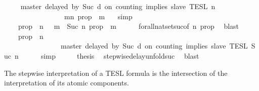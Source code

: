 \begin{isabellebody}
\ \ \isamarkupfalse%
\ {\isacartoucheopen}{\isasymlbrakk}\ master\ delayed\ by\ {\isacharparenleft}Suc\ d{\isacharparenright}\ on\ counting\ implies\ slave\ {\isasymrbrakk}\isactrlsub T\isactrlsub E\isactrlsub S\isactrlsub L\isactrlbsup {\isasymge}\ n\isactrlesup \ {\isacharequal}\isanewline
\ \ \ \ \ \ \ \ \ \ \ \ \ \ \ \ {\isacharbraceleft}{\isasymrho}{\isachardot}\ {\isasymforall}m{\isasymge}n{\isachardot}\ {\isacharquery}prop\ {\isasymrho}\ m{\isacharbraceright}\ {\isacartoucheclose}\ \isamarkupfalse%
\ simp\isanewline
\ \ \isamarkupfalse%
\ \isamarkupfalse%
\ {\isacartoucheopen}{\isachardot}{\isachardot}{\isachardot}\ {\isacharequal}\ {\isacharbraceleft}{\isasymrho}{\isachardot}\ {\isacharquery}prop\ {\isasymrho}\ n{\isacharbraceright}\ {\isasyminter}\ {\isacharbraceleft}{\isasymrho}{\isachardot}\ {\isasymforall}m\ {\isasymge}\ Suc\ n{\isachardot}\ {\isacharquery}prop\ {\isasymrho}\ m{\isacharbraceright}{\isacartoucheclose}\isanewline
\ \ \ \ \isamarkupfalse%
\ forall{\isacharunderscore}nat{\isacharunderscore}set{\isacharunderscore}suc{\isacharbrackleft}of\ {\isacartoucheopen}n{\isacartoucheclose}\ {\isacartoucheopen}{\isacharquery}prop{\isacartoucheclose}{\isacharbrackright}\ \isamarkupfalse%
\ blast\isanewline
\ \ \isamarkupfalse%
\ \isamarkupfalse%
\ {\isacartoucheopen}{\isachardot}{\isachardot}{\isachardot}\ {\isacharequal}\ {\isacharbraceleft}{\isasymrho}{\isachardot}\ {\isacharquery}prop\ {\isasymrho}\ n{\isacharbraceright}\isanewline
\ \ \ \ \ \ \ \ \ \ \ \ \ \ {\isasyminter}\ {\isasymlbrakk}\ master\ delayed\ by\ {\isacharparenleft}Suc\ d{\isacharparenright}\ on\ counting\ implies\ slave\ {\isasymrbrakk}\isactrlsub T\isactrlsub E\isactrlsub S\isactrlsub L\isactrlbsup {\isasymge}\ Suc\ n\isactrlesup {\isacartoucheclose}\isanewline
\ \ \ \ \isamarkupfalse%
\ simp\isanewline
\ \ \isamarkupfalse%
\ \isamarkupfalse%
\ {\isacharquery}thesis\ \isamarkupfalse%
\ stepwise{\isacharunderscore}delay{\isacharunderscore}unfold{\isacharunderscore}suc\ \isamarkupfalse%
\ blast\isanewline
{}\isamarkupfalse%
%
\endisatagproof
{\isafoldproof}%
%
\isadelimproof
%
\endisadelimproof
%
\begin{isamarkuptext}%
The stepwise interpretation of a TESL formula is the intersection of the
  interpretation of its atomic components.%
\end{isamarkuptext}\isamarkuptrue%

\end{isabellebody}
